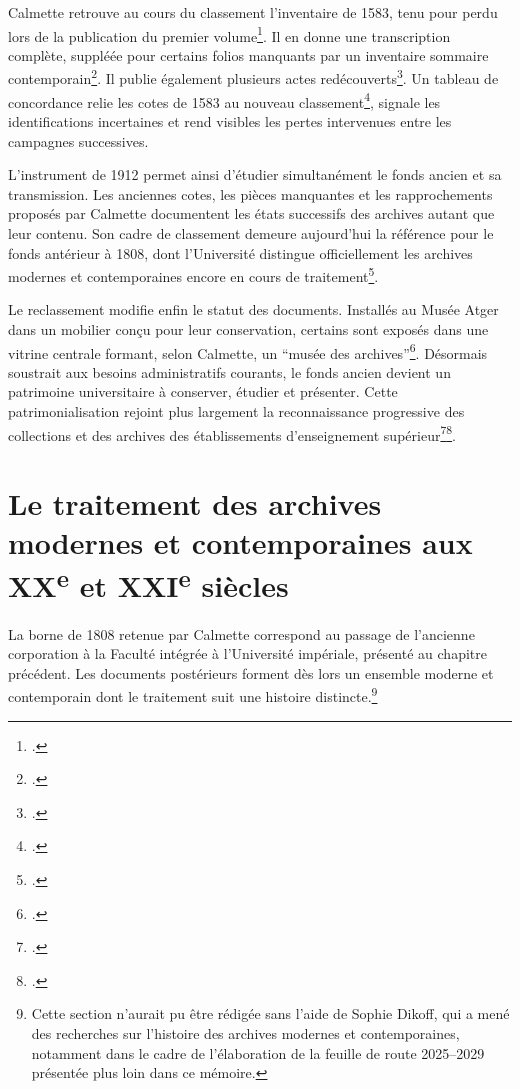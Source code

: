 Calmette retrouve au cours du classement l'inventaire de 1583, tenu pour perdu lors de la publication du premier volume\footcite[p.~XXXII, vue~59 de la version numérisée]{GermainUniversite1890}. Il en donne une transcription complète, suppléée pour certains folios manquants par un inventaire sommaire contemporain\footcite{AHFMA2}. Il publie également plusieurs actes redécouverts\footcite[p.~851-869, vues~1039 à 1057 de la version numérisée]{CalmetteCartulaire1912}. Un tableau de concordance relie les cotes de 1583 au nouveau classement\footcite[p.~CXLVII-CLVIII, vues~173 à 184 de la version numérisée]{CalmetteCartulaire1912}, signale les identifications incertaines et rend visibles les pertes intervenues entre les campagnes successives.

L'instrument de 1912 permet ainsi d'étudier simultanément le fonds ancien et sa transmission. Les anciennes cotes, les pièces manquantes et les rapprochements proposés par Calmette documentent les états successifs des archives autant que leur contenu. Son cadre de classement demeure aujourd'hui la référence pour le fonds antérieur à 1808, dont l'Université distingue officiellement les archives modernes et contemporaines encore en cours de traitement\footcite{UMPatrimoineArchives}.

Le reclassement modifie enfin le statut des documents. Installés au Musée Atger dans un mobilier conçu pour leur conservation, certains sont exposés dans une vitrine centrale formant, selon Calmette, un \enquote{musée des archives}\footcite[p.~XVI-XXI, vues~35 à 40 de la version numérisée]{CalmetteCartulaire1912}. Désormais soustrait aux besoins administratifs courants, le fonds ancien devient un patrimoine universitaire à conserver, étudier et présenter. Cette patrimonialisation rejoint plus largement la reconnaissance progressive des collections et des archives des établissements d'enseignement supérieur\footcite{MadayMechine2011}\footcite{Hottin2008}.

\section{Le traitement des archives modernes et contemporaines aux XX\textsuperscript{e} et XXI\textsuperscript{e} siècles}

La borne de 1808 retenue par Calmette correspond au passage de l'ancienne corporation à la Faculté intégrée à l'Université impériale, présenté au chapitre précédent. Les documents postérieurs forment dès lors un ensemble moderne et contemporain dont le traitement suit une histoire distincte.\footnote{Cette section n'aurait pu être rédigée sans l'aide de Sophie Dikoff, qui a mené des recherches sur l'histoire des archives modernes et contemporaines, notamment dans le cadre de l'élaboration de la feuille de route 2025--2029 présentée plus loin dans ce mémoire.}

